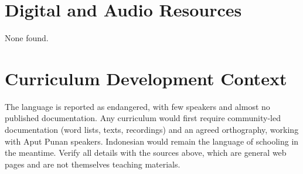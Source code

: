 \documentclass[12pt]{article}
\begin{document}
\section{Digital and Audio Resources}
None found.

\section{Curriculum Development Context}
The language is reported as endangered, with few speakers and almost no published documentation. Any curriculum would first require community-led documentation (word lists, texts, recordings) and an agreed orthography, working with Aput Punan speakers. Indonesian would remain the language of schooling in the meantime. Verify all details with the sources above, which are general web pages and are not themselves teaching materials.
\end{document}
